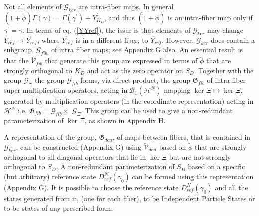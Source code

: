 \documentclass[aps,preprint]{revtex4}%
\begin{document}
Not all elements of $\mathcal{G}_{ker}$ are intra-fiber maps. In general
$\left(  1+\breve{\phi}\right)  \Gamma\left(  \gamma\right)  =\Gamma\left(
\gamma^{\prime}\right)  +Y_{K_{D}}^{\prime}$, and thus $\left(  1+\breve{\phi
}\right)  $ is an intra-fiber map only if $\gamma^{\prime}=\gamma$. In terms
of eq. (\ref{YYref}), the issue is that elements of $\mathcal{G}_{ker}$ may
change $Y_{ref}\rightarrow Y_{ref}^{\prime}$, where $Y_{ref}^{\prime}$ is in a
different fiber, to $Y_{ref}$. However, $\mathcal{G}_{ker}$ does contain a
subgroup, $\mathcal{G}_{fib\text{,}}$ of intra fiber maps; see Appendix G
also. An essential result is that the $\mathcal{\breve{V}}_{fib}$ that
generate this group are expressed in terms of $\breve{\phi}$ that are strongly
orthogonal to $K_{D}$ and act as the zero operator on $S_{D}$. Together with
the group $\mathcal{G}_{\Xi}$ the group $\mathcal{G}_{fib}$ forms, via direct
product, the group $\mathfrak{G}_{fib}$ of intra fiber super multiplication
operators, acting in $\mathcal{B}_{1}\left(  \mathcal{H}^{N}\right)  $ mapping
$\ker\Xi\mapsto\ker\Xi,$ generated by multiplication operators (in the
coordinate representation) acting in $\mathcal{H}^{N}$ i.e. $\mathfrak{G}%
_{fib}=\mathcal{G}_{fib}\times$ $\mathcal{G}_{\Xi}$. This group can be used to
give a non-redundant parameterization of $\ker\Xi$, as shown in Appendix H.

A representation of the group, $\mathfrak{G}_{den}$, of maps between fibers,
that is contained in $\mathcal{G}_{ker}$, can be constructed (Appendix G)
using $\mathcal{\breve{V}}_{den}$ based on $\breve{\phi}$ that are strongly
orthogonal to all diagonal operators that lie in $\ker\Xi$ but are not
strongly orthogonal to $S_{D}$. A non-redundant parameterization of $S_{D}$
based on a specific (but arbitrary) reference state $D_{ref}^{N}\left(
\gamma_{0}\right)  $ can be formed using this representation (Appendix G). It
is possible to choose the reference state $D_{ref}^{N}\left(  \gamma
_{0}\right)  $ and all the states generated from it, (one for each fiber), to
be Independent Particle States or to be states of any prescribed form.
\end{document}
